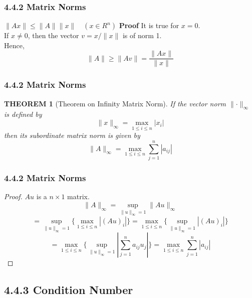 \documentclass[notheorems,mathserif,table,compress]{beamer}  %
\begin{document}
 
\begin{frame}
  \frametitle{4.4.2 Matrix Norms}
  \begin{block}{$\parallel Ax\parallel \le \parallel A\parallel \parallel x\parallel \quad (x\in R^n)$}
  \textbf{Proof} \quad \qquad
  It is true for $x=0$.\\
  \quad \qquad \qquad \quad If $x\ne0$, then the vector $v=x/\parallel x\parallel$ is of norm 1.\\
  \quad \qquad \qquad \quad Hence, 
  \[ \parallel A\parallel \ge \parallel Av\parallel=\frac{\parallel Ax\parallel}{\parallel x\parallel} \]
  \end{block}
\end{frame}


\begin{frame}
  \frametitle{4.4.2 Matrix Norms}
  \newtheorem{theorem2}[theorem1]{THEOREM}
  \begin{theorem2}[Theorem on Infinity Matrix Norm]
  If the vector norm $\parallel\cdot\parallel_\infty$ is defined by
  \[ \parallel x\parallel_\infty=\max_{1\le i\le n}|x_i| \]
  then its subordinate matrix norm is given by
  \[ \parallel A\parallel_\infty=\max_{1\le i\le n}\sum_{j=1}^{n} |a_{ij}| \]
  \end{theorem2}
\end{frame}


\begin{frame}
  \frametitle{4.4.2 Matrix Norms}
  \begin{proof}
  $Au$ is a $n\times1$ matrix. 
  \[ \parallel A\parallel_\infty=\sup_{\parallel u\parallel_\infty=1} \parallel Au\parallel_\infty \]
  \[ =\sup_{\parallel u\parallel_\infty=1}\Big\{ \max_{1\le i\le n} |(Au)_i|\Big\}=\max_{1 \le i\le n}\Big\{ \sup_{\parallel u\parallel_\infty=1} |(Au)_i|\Big\} \]
  \[ =\max_{1 \le i\le n}\Big\{ \sup_{\parallel u\parallel_\infty=1} |\sum_{j=1}^{n} a_{ij}u_j|\Big\}=\max_{1\le i\le n}\sum_{j=1}^{n}|a_{ij}| \]
  \end{proof}
\end{frame}


\subsection{4.4.3 Condition Number}
\end{document}
